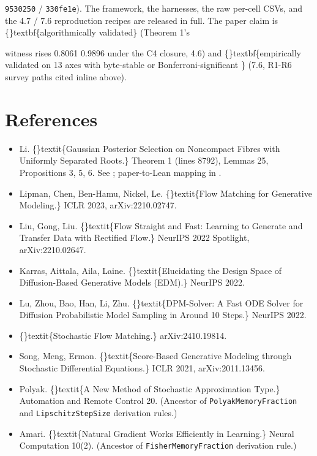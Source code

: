\documentclass{article}
\begin{document}
\texttt{9530250} / \texttt{330fe1e}). The framework, the harnesses, the raw per-cell CSVs, and the 4.7 / 7.6 reproduction recipes are released in full. The paper claim is \{\}textbf\{algorithmically validated\} (Theorem 1's

 witness rises 0.8061  0.9896 under the C4 closure, 4.6) and \{\}textbf\{empirically validated on 13 axes with byte-stable or Bonferroni-significant \} (7.6, R1-R6 survey paths cited inline above).

\section*{References}
\small
\begin{itemize}
\item [Li 2026] Li. \{\}textit\{Gaussian Posterior Selection on Noncompact Fibres with Uniformly Separated Roots.\} Theorem 1 (lines 8792), Lemmas 25, Propositions 3, 5, 6. See ; paper-to-Lean mapping in .
\item [Lipman 2023] Lipman, Chen, Ben-Hamu, Nickel, Le. \{\}textit\{Flow Matching for Generative Modeling.\} ICLR 2023, arXiv:2210.02747.
\item [Liu 2022] Liu, Gong, Liu. \{\}textit\{Flow Straight and Fast: Learning to Generate and Transfer Data with Rectified Flow.\} NeurIPS 2022 Spotlight, arXiv:2210.02647.
\item [Karras 2022] Karras, Aittala, Aila, Laine. \{\}textit\{Elucidating the Design Space of Diffusion-Based Generative Models (EDM).\} NeurIPS 2022.
\item [Lu 2022] Lu, Zhou, Bao, Han, Li, Zhu. \{\}textit\{DPM-Solver: A Fast ODE Solver for Diffusion Probabilistic Model Sampling in Around 10 Steps.\} NeurIPS 2022.
\item [NVIDIA 2024] \{\}textit\{Stochastic Flow Matching.\} arXiv:2410.19814.
\item [Song 2021] Song, Meng, Ermon. \{\}textit\{Score-Based Generative Modeling through Stochastic Differential Equations.\} ICLR 2021, arXiv:2011.13456.
\item [Polyak 1969] Polyak. \{\}textit\{A New Method of Stochastic Approximation Type.\} Automation and Remote Control 20. (Ancestor of \texttt{PolyakMemoryFraction} and \texttt{LipschitzStepSize} derivation rules.)
\item [Amari 1998] Amari. \{\}textit\{Natural Gradient Works Efficiently in Learning.\} Neural Computation 10(2). (Ancestor of \texttt{FisherMemoryFraction} derivation rule.)

\end{itemize}
\end{document}
